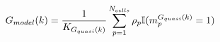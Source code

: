 \vspace{-0.1cm}
\begin{equation}
    G_{model}(k) = \frac{1}{K_{G_{quasi}(k)}}\sum_{p = 1}^{N_{cells}} \rho_p \mathbb{I}(m_p^{G_{quasi}(k)} = 1)
    \label{eq:quasi-geomodel}
    \vspace{-0.05cm}
\end{equation}
